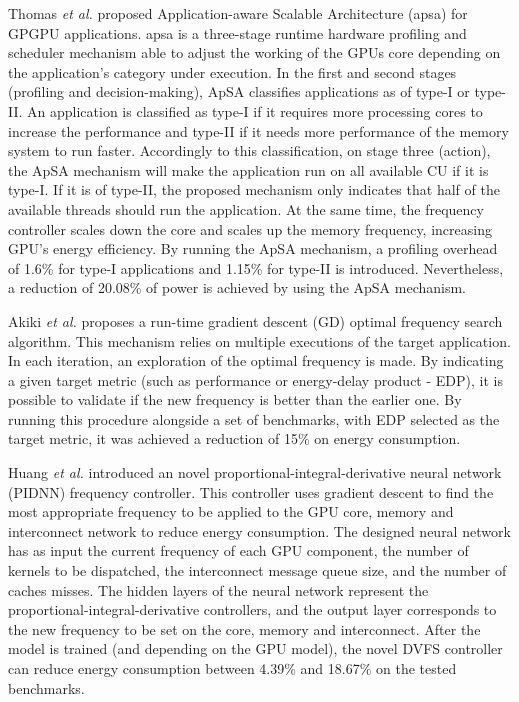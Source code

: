 Thomas \textit{et al.} \cite{thomas_application_2018} proposed Application-aware Scalable Architecture (\acrshort{apsa}) for GPGPU applications. \acrshort{apsa} is a three-stage runtime hardware profiling and scheduler mechanism able to adjust the working of the GPUs core depending on the application's category under execution. In the first and second stages (profiling and decision-making), ApSA classifies applications as of type-I or type-II. An application is classified as type-I if it requires more processing cores to increase the performance and type-II if it needs more performance of the memory system to run faster. Accordingly to this classification, on stage three (action), the ApSA mechanism will make the application run on all available CU if it is type-I. If it is of type-II, the proposed mechanism only indicates that half of the available threads should run the application. At the same time, the frequency controller scales down the core and scales up the memory frequency, increasing GPU's energy efficiency. By running the ApSA mechanism, a profiling overhead of 1.6\% for type-I applications and 1.15\% for type-II is introduced. Nevertheless, a reduction of 20.08\% of power is achieved by using the ApSA mechanism.




Akiki \textit{et al.} \cite{akiki_energy-aware_2018} proposes a run-time gradient descent (GD) optimal frequency search algorithm. This mechanism relies on multiple executions of the target application. In each iteration, an exploration of the optimal frequency is made. By indicating a given target metric (such as performance or energy-delay product - EDP), it is possible to validate if the new frequency is better than the earlier one. By running this procedure alongside a set of benchmarks, with EDP selected as the target metric, it was achieved a reduction of 15\% on energy consumption.

Huang \textit{et al.} \cite{huang_gpu_2019} introduced an novel proportional-integral-derivative neural network (PIDNN) frequency controller. This controller uses gradient descent to find the most appropriate frequency to be applied to the GPU core, memory and interconnect network to reduce energy consumption. The designed neural network has as input the current frequency of each GPU component, the number of kernels to be dispatched, the interconnect message queue size, and the number of caches misses. The hidden layers of the neural network represent the proportional-integral-derivative controllers, and the output layer corresponds to the new frequency to be set on the core, memory and interconnect. After the model is trained (and depending on the GPU model), the novel DVFS controller can reduce energy consumption between 4.39\% and 18.67\% on the tested benchmarks.





